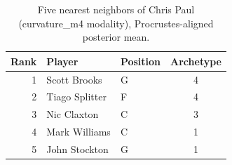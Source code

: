 \begin{table}[htbp]
  \centering\small
  \begin{tabular}{rllc}
    \toprule
    Rank & Player & Position & Archetype \\
    \midrule
    1 & Scott Brooks & G & 4 \\
    2 & Tiago Splitter & F & 4 \\
    3 & Nic Claxton & C & 3 \\
    4 & Mark Williams & C & 1 \\
    5 & John Stockton & G & 1 \\
    \bottomrule
  \end{tabular}
  \caption{Five nearest neighbors of Chris Paul (curvature_m4 modality), Procrustes-aligned posterior mean.}
  \label{tab:Chris_Paul_neighbors_curvature_m4}
\end{table}

